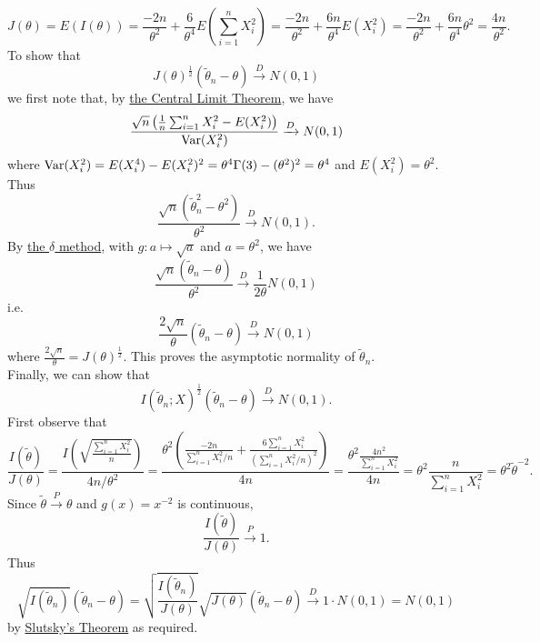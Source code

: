 \documentclass[11pt,fleqn]{book} %
\begin{document}
\begin{example}
\[
J(\theta) = E(I(\theta)) = \frac{-2n}{\theta^2} + \frac{6}{\theta^4}E\left(\sum_{i=1}^n X_i^2\right) = \frac{-2n}{\theta^2} + \frac{6n}{\theta^4}E(X_i^2) = \frac{-2n}{\theta^2} + \frac{6n}{\theta^4}\theta^2 = \frac{4n}{\theta^2}.
\]
\indent To show that
\[
J(\theta)^{\frac12}(\tilde{\theta}_n - \theta) \xrightarrow{D} N(0, 1)
\]
we first note that, by \hyperref[thm:443]{the Central Limit Theorem}, we have
\[
\frac{\sqrt{n}\left(\frac1n\sum_{i=1}^n X_i^2 - E(X_i^2)\right)}{\operatorname{Var}(X_i^2)} \xrightarrow{D} N(0, 1)
\]
where \(\operatorname{Var}(X_i^2) = E(X_i^4) - E(X_i^2)^2 = \theta^4\Gamma(3) - (\theta^2)^2 = \theta^4\) and \(E(X_i^2) = \theta^2\). Thus
\[
\frac{\sqrt{n}(\tilde{\theta}_n^2 - \theta^2)}{\theta^2} \xrightarrow{D} N(0, 1).
\]
\indent By \hyperref[thm:448]{the \(\delta\) method}, with \(g: a\mapsto\sqrt{a}\) and \(a = \theta^2\), we have
\[
\frac{\sqrt{n}(\tilde{\theta}_n - \theta)}{\theta^2} \xrightarrow{D} \frac{1}{2\theta} N(0, 1)
\]
i.e.
\[
\frac{2\sqrt{n}}{\theta}(\tilde{\theta}_n - \theta) \xrightarrow{D} N(0, 1)
\]
where \(\frac{2\sqrt{n}}{\theta} = J(\theta)^{\frac12}\). This proves the asymptotic normality of \(\tilde{\theta}_n\). \\
\indent Finally, we can show that
\[
I(\tilde{\theta}_n; X)^{\frac12}(\tilde{\theta}_n - \theta) \xrightarrow{D} N(0, 1).
\]
\indent First observe that
\[
\frac{I(\tilde{\theta})}{J(\theta)} = \frac{I\left(\sqrt{\frac{\sum_{i=1}^nX_i^2}{n}}\right)}{4n / \theta^2} = \frac{\theta^2\left(\frac{-2n}{\sum_{i=1}^nX_i^2 / n} + \frac{6\sum_{i=1}^nX_i^2}{\left(\sum_{i=1}^n X_i^2 / n\right)^2}\right)}{4n} = \frac{\theta^2\frac{4n^2}{\sum_{i=1}^n X_i^2}}{4n} = \theta^2 \frac{n}{\sum_{i=1}^n X_i^2} = \theta^2 \tilde{\theta}^{-2}.
\]
\indent Since \(\tilde{\theta}\xrightarrow{P}\theta\) and \(g(x) = x^{-2}\) is continuous,
\[
\frac{I(\tilde{\theta})}{J(\theta)} \xrightarrow{P} 1.
\]
\indent Thus
\[
\sqrt{I(\tilde{\theta}_n)}(\tilde{\theta}_n - \theta) = \sqrt{\frac{I(\tilde{\theta}_n)}{J(\theta)}}\sqrt{J(\theta)}(\tilde{\theta}_n - \theta) \xrightarrow{D} 1 \cdot N(0, 1) = N(0, 1)
\]
by \hyperref[thm:447]{Slutsky's Theorem} as required.
\end{example}
\end{document}
